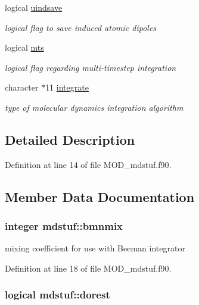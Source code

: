 \begin{DoxyCompactItemize}
logical \hyperlink{classmdstuf_a6d1ab76dd4c24b9372a1a5e581fa11ad}{uindsave}
\begin{DoxyCompactList}\small\item\em logical flag to save induced atomic dipoles \end{DoxyCompactList}\item 
logical \hyperlink{classmdstuf_a1d05be369fe503f113d843b3a8812e19}{mts}
\begin{DoxyCompactList}\small\item\em logical flag regarding multi-\/timestep integration \end{DoxyCompactList}\item 
character $\ast$11 \hyperlink{classmdstuf_af7e0b69126944da571344ddd7d2daef0}{integrate}
\begin{DoxyCompactList}\small\item\em type of molecular dynamics integration algorithm \end{DoxyCompactList}\end{DoxyCompactItemize}


\subsection{Detailed Description}


Definition at line 14 of file M\-O\-D\-\_\-mdstuf.\-f90.



\subsection{Member Data Documentation}
\hypertarget{classmdstuf_a93d7b9c01fb5b705487ed34d0c4c3849}{
\subsubsection[{bmnmix}]{\setlength{\rightskip}{0pt plus 5cm}integer mdstuf\-::bmnmix}}\label{classmdstuf_a93d7b9c01fb5b705487ed34d0c4c3849}


mixing coefficient for use with Beeman integrator 



Definition at line 18 of file M\-O\-D\-\_\-mdstuf.\-f90.

\hypertarget{classmdstuf_a489e81840601f3b7b3f5247681e15cdb}{
\subsubsection[{dorest}]{\setlength{\rightskip}{0pt plus 5cm}logical mdstuf\-::dorest}}\label{classmdstuf_a489e81840601f3b7b3f5247681e15cdb}


